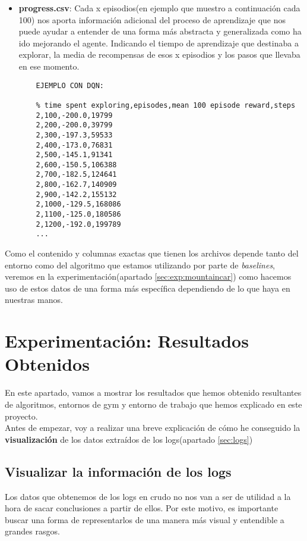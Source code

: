 \documentclass[11pt,fleqn]{book} %
\begin{document}
\begin{itemize}
	\item \textbf{progress.csv}: Cada x episodios(en ejemplo que muestro a continuación cada 100) nos aporta información adicional del proceso de aprendizaje que nos puede ayudar a entender de una forma más abstracta y generalizada como ha ido mejorando el agente. Indicando el tiempo de aprendizaje que destinaba a explorar, la media de recompensas de esos x episodios y los pasos que llevaba en ese momento.\\
	
	
	\begin{verbatim}
	EJEMPLO CON DQN:
	
	% time spent exploring,episodes,mean 100 episode reward,steps
	2,100,-200.0,19799
	2,200,-200.0,39799
	2,300,-197.3,59533
	2,400,-173.0,76831
	2,500,-145.1,91341
	2,600,-150.5,106388
	2,700,-182.5,124641
	2,800,-162.7,140909
	2,900,-142.2,155132
	2,1000,-129.5,168086
	2,1100,-125.0,180586
	2,1200,-192.0,199789
	...
	\end{verbatim}
\end{itemize}

Como el contenido y columnas exactas que tienen los archivos depende tanto del entorno como del algoritmo que estamos utilizando por parte de \textit{baselines}, veremos en la experimentación(apartado \ref{sec:exp:mountaincar}) como hacemos uso de estos datos de una forma más específica dependiendo de lo que haya en nuestras manos.

\chapter{Experimentación: Resultados Obtenidos}

En este apartado, vamos a mostrar los resultados que hemos obtenido resultantes de algoritmos, entornos de gym y entorno de trabajo que hemos explicado en este proyecto. \\

Antes de empezar, voy a realizar una breve explicación de cómo he conseguido la \textbf{visualización} de los datos extraídos de los logs(apartado \ref{sec:logs})

\section{Visualizar la información de los logs}

Los datos que obtenemos de los logs en crudo no nos van a ser de utilidad a la hora de sacar conclusiones a partir de ellos. Por este motivo, es importante buscar una forma de representarlos de una manera más visual y entendible a grandes rasgos. \\
\end{document}
